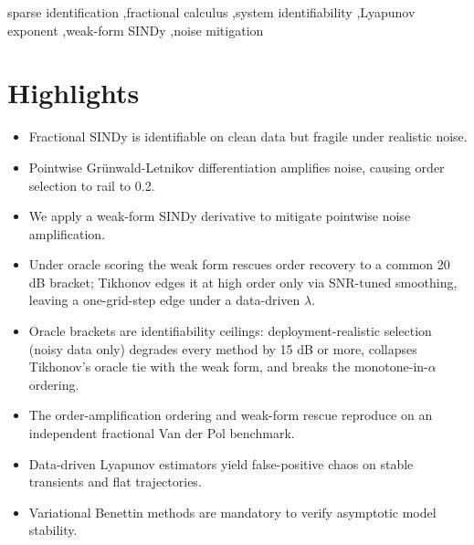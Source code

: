 \documentclass[review,3p,times]{elsarticle}
\begin{document}
\begin{frontmatter}
\begin{abstract}
$35$--$45$ dB and pointwise to $60$--$70$ dB ($15$--$30$ dB each), while Tikhonov, re-scored under the same rule, loses to weak-form at every order and with fixed $\lambda$ fails outright at $\alpha_t = 0.5$---and the monotone-in-$\alpha$ ordering does not survive; weak-form remains the only deployable selector among the mitigations tested, but a modest one. The practitioner takeaway is that data-driven fractional order selection must be anchored to model-based diagnostics, and clean-data brackets should not be read as deployable thresholds. The monotone $A(\alpha)$ ordering, the clean two-sided identifiability, and the weak-form rescue all reproduce on an independent fractional Van der Pol benchmark. Finally, for the same system, variational Benettin integration confirms a stable fixed point ($\lambda_{\max} = -0.073362$) while data-driven Rosenstein estimates yield spurious positive exponents ($+0.010285$ transient, $+0.043278$ stationary, $+0.018965$ overall), underscoring that tangent-space diagnostics, not data-driven ones, arbitrate stability on transient or flat trajectories.
\end{abstract}

\begin{keyword}
sparse identification \sep fractional calculus \sep system identifiability \sep Lyapunov exponent \sep weak-form SINDy \sep noise mitigation
\end{keyword}

\end{frontmatter}

\section*{Highlights}
\begin{itemize}
  \item Fractional SINDy is identifiable on clean data but fragile under realistic noise.
  \item Pointwise Gr\"unwald-Letnikov differentiation amplifies noise, causing order selection to rail to 0.2.
  \item We apply a weak-form SINDy derivative to mitigate pointwise noise amplification.
  \item Under oracle scoring the weak form rescues order recovery to a common 20 dB bracket; Tikhonov edges it at high order only via SNR-tuned smoothing, leaving a one-grid-step edge under a data-driven $\lambda$.
  \item Oracle brackets are identifiability ceilings: deployment-realistic selection (noisy data only) degrades every method by 15 dB or more, collapses Tikhonov's oracle tie with the weak form, and breaks the monotone-in-$\alpha$ ordering.
  \item The order-amplification ordering and weak-form rescue reproduce on an independent fractional Van der Pol benchmark.
  \item Data-driven Lyapunov estimators yield false-positive chaos on stable transients and flat trajectories.
  \item Variational Benettin methods are mandatory to verify asymptotic model stability.
\end{itemize}
\end{document}
